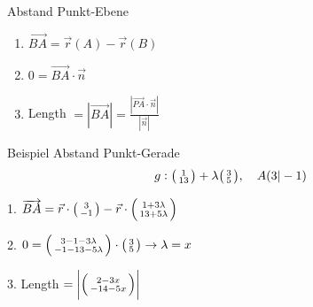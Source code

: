 \begin{KR}{Abstand Punkt-Ebene}
    \begin{enumerate}
        \item $\overrightarrow{BA} = \overrightarrow{r}(A) - \overrightarrow{r}(B)$
        \item $0 = \overrightarrow{BA} \cdot \overrightarrow{n}$
        \item Length $= |\overrightarrow{BA}| = \frac{|\overrightarrow{PA} \cdot \overrightarrow{n}|}{|\overrightarrow{n}|}$
    \end{enumerate}
\end{KR}

\begin{example2}{Beispiel Abstand Punkt-Gerade}
    $$g: \begin{psmallmatrix} 1 \\ 13 \end{psmallmatrix} + \lambda \begin{psmallmatrix} 3 \\ 5 \end{psmallmatrix}, \quad A(3|-1)$$
    \begin{minipage}{0.5\linewidth}
    1. $\overrightarrow{BA} = \vec{r} \cdot \begin{psmallmatrix} 3 \\ -1 \end{psmallmatrix} - \vec{r} \cdot \begin{psmallmatrix} 1 + 3 \lambda \\ 13 + 5 \lambda \end{psmallmatrix}$

    \vspace{2mm}
    
    2. $0 = \begin{psmallmatrix} 3 - 1 - 3 \lambda \\ -1 - 13 - 5 \lambda \end{psmallmatrix} \cdot \begin{psmallmatrix} 3 \\ 5 \end{psmallmatrix} \rightarrow \lambda = x$
    \end{minipage}
    \hspace{4mm}
    \begin{minipage}{0.4\linewidth}
    3. Length $ = \left| \begin{psmallmatrix} 2 - 3x \\ -14 - 5x \end{psmallmatrix} \right|$
    \end{minipage}
\end{example2}











